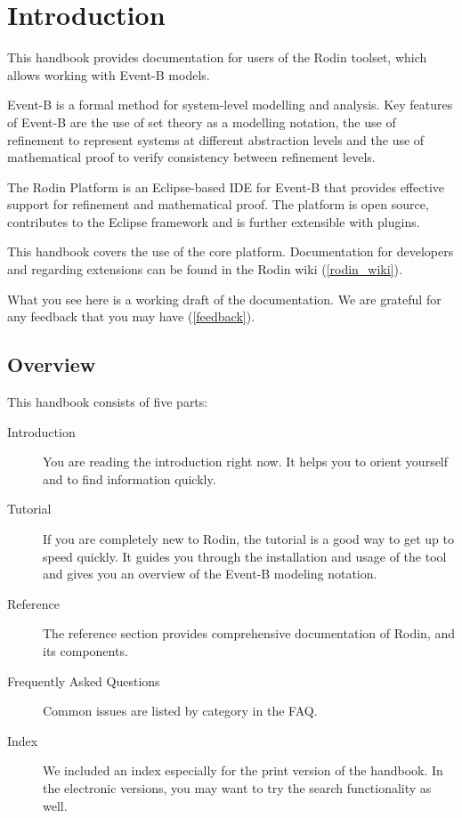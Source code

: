 \documentclass[12pt]{book}
\begin{document}
\chapter{Introduction}

This handbook provides documentation for users of the Rodin toolset, which allows working with Event-B models.

Event-B is a formal method for system-level modelling and analysis. Key features of Event-B are the use of set theory as a modelling notation, the use of refinement to represent systems at different abstraction levels and the use of mathematical proof to verify consistency between refinement levels.

The Rodin Platform is an Eclipse-based IDE for Event-B that provides effective support for refinement and mathematical proof. The platform is open source, contributes to the Eclipse framework and is further extensible with plugins. 

This handbook covers the use of the core platform.  Documentation for developers and regarding extensions can be found in the Rodin wiki (\ref{rodin_wiki}).

What you see here is a working draft of the documentation.  We are grateful for any feedback that you may have (\ref{feedback}).

\section{Overview}

This handbook consists of five parts:

\begin{description}
	\item[Introduction] You are reading the introduction right now.  It helps you to orient yourself and to find information quickly.
	\item[Tutorial] If you are completely new to Rodin, the tutorial is a good way to get up to speed quickly.  It guides you through the installation and usage of the tool and gives you an overview of the Event-B modeling notation.
	\item[Reference] The reference section provides comprehensive documentation of Rodin, and its components.
	\item[Frequently Asked Questions] Common issues are listed by category in the FAQ.
	\item[Index] We included an index especially for the print version of the handbook.  In the electronic versions, you may want to try the search functionality as well.
\end{description}
\end{document}
